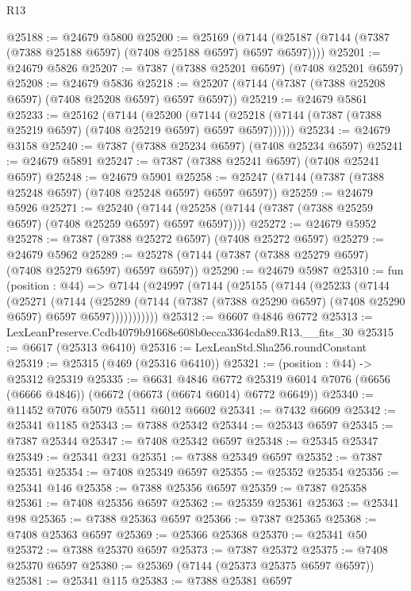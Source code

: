 \begin{lexlean}{R13}
\begin{coremodule}
@25188 := @24679 @5800
@25200 := @25169
    (@7144 (@25187 (@7144 (@7387 (@7388 @25188 @6597) (@7408 @25188 @6597) @6597 @6597))))
@25201 := @24679 @5826
@25207 := @7387 (@7388 @25201 @6597) (@7408 @25201 @6597)
@25208 := @24679 @5836
@25218 := @25207 (@7144 (@7387 (@7388 @25208 @6597) (@7408 @25208 @6597) @6597 @6597))
@25219 := @24679 @5861
@25233 := @25162
    (@7144
      (@25200
        (@7144 (@25218 (@7144 (@7387 (@7388 @25219 @6597) (@7408 @25219 @6597) @6597 @6597))))))
@25234 := @24679 @3158
@25240 := @7387 (@7388 @25234 @6597) (@7408 @25234 @6597)
@25241 := @24679 @5891
@25247 := @7387 (@7388 @25241 @6597) (@7408 @25241 @6597)
@25248 := @24679 @5901
@25258 := @25247 (@7144 (@7387 (@7388 @25248 @6597) (@7408 @25248 @6597) @6597 @6597))
@25259 := @24679 @5926
@25271 := @25240
    (@7144 (@25258 (@7144 (@7387 (@7388 @25259 @6597) (@7408 @25259 @6597) @6597 @6597))))
@25272 := @24679 @5952
@25278 := @7387 (@7388 @25272 @6597) (@7408 @25272 @6597)
@25279 := @24679 @5962
@25289 := @25278 (@7144 (@7387 (@7388 @25279 @6597) (@7408 @25279 @6597) @6597 @6597))
@25290 := @24679 @5987
@25310 := fun (position : @44) =>
  @7144
    (@24997
      (@7144
        (@25155
          (@7144
            (@25233
              (@7144
                (@25271
                  (@7144
                    (@25289
                      (@7144 (@7387 (@7388 @25290 @6597) (@7408 @25290 @6597) @6597 @6597)))))))))))
@25312 := @6607 @4846 @6772
@25313 := LexLeanPreserve.Ccdb4079b91668e608b0ecca3364cda89.R13.__fits_30
@25315 := @6617 (@25313 @6410)
@25316 := LexLeanStd.Sha256.roundConstant
@25319 := @25315 (@469 (@25316 @6410))
@25321 := (position : @44) -> @25312 @25319
@25335 := @6631
    @4846
    @6772
    @25319
    @6014
    @7076
    (@6656 (@6666 @4846))
    (@6672 (@6673 (@6674 @6014) @6772 @6649))
@25340 := @11452 @7076 @5079 @5511 @6012 @6602
@25341 := @7432 @6609
@25342 := @25341 @1185
@25343 := @7388 @25342
@25344 := @25343 @6597
@25345 := @7387 @25344
@25347 := @7408 @25342 @6597
@25348 := @25345 @25347
@25349 := @25341 @231
@25351 := @7388 @25349 @6597
@25352 := @7387 @25351
@25354 := @7408 @25349 @6597
@25355 := @25352 @25354
@25356 := @25341 @146
@25358 := @7388 @25356 @6597
@25359 := @7387 @25358
@25361 := @7408 @25356 @6597
@25362 := @25359 @25361
@25363 := @25341 @98
@25365 := @7388 @25363 @6597
@25366 := @7387 @25365
@25368 := @7408 @25363 @6597
@25369 := @25366 @25368
@25370 := @25341 @50
@25372 := @7388 @25370 @6597
@25373 := @7387 @25372
@25375 := @7408 @25370 @6597
@25380 := @25369 (@7144 (@25373 @25375 @6597 @6597))
@25381 := @25341 @115
@25383 := @7388 @25381 @6597

\end{coremodule}
\end{lexlean}
